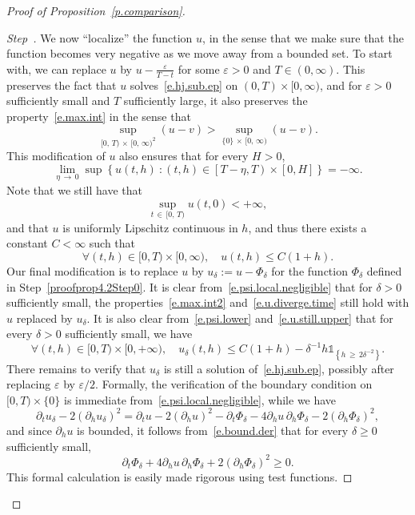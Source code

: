 \documentclass[10pt]{amsart}
\theoremstyle{definition}\newtheorem{defi}[theo]{Definition}\newtheorem{rema}[theo]{Remark}\newtheorem{exam}[theo]{Example}\newtheorem{exem}[theo]{Example}\newtheorem{nota}[theo]{Notation}
\newcommand{\1}{\mathds{1}}
\newcommand{\ep}{\varepsilon}
\renewcommand{\le}{\leqslant}
\renewcommand{\ge}{\geqslant}
\newcommand{\de}{\delta}
\newcounter{stepcount}
\newenvironment{step}{\refstepcounter{stepcount}\begin{proof}[Step~\thestepcount]}{\let\qed\relax\end{proof}}
\let\oldforall\forall
\renewcommand*{\forall}{\mathrel{\oldforall}}
\begin{document}
\begin{proof}[Proof of Proposition~\ref{p.comparison}]
\begin{step}\label{proofprop4.2Step2}
We now ``localize'' the function $u$, in the sense that we make sure that the function becomes very negative as we move away from a bounded set. To start with, we can replace $u$ by $u-\tfrac{\ep}{T-t}$ for some $\ep > 0$ and $T \in (0,\infty)$. This preserves the fact that $u$ solves~\eqref{e.hj.sub.ep} on $(0,T)\times [0,\infty)$, and for $\ep > 0$ sufficiently small and $T$ sufficiently large, it also preserves the property~\eqref{e.max.int} in the sense that
\begin{equation}\label{e.max.int2}
\sup_{[0,\,T)\,\times\,[0,\,\infty)^2} (u-v) > \sup_{\{0\}\,\times \,[0,\,\infty)} (u-v).
\end{equation}
This modification of $u$ also ensures that for every $H > 0$,
\begin{equation}\label{e.u.diverge.time}
\lim_{\eta\,\to\,0} \sup \left\{u(t,h) \ : (t,h) \in \left[T - \eta,T\right) \times [0, H]\right\} = -\infty.
\end{equation}
Note that we still have that
\[
\sup_{t\,\in\,[0,\,T)} u(t,0) < + \infty,
\]
and that $u$ is uniformly Lipschitz continuous in $h$, and thus there exists a constant $C < \infty$ such that
\begin{equation}\label{e.u.still.upper}
\forall (t,h) \in [0,T)\times [0,\infty), \quad u(t,h) \le C(1+h).
\end{equation}
Our final modification is to replace $u$ by $u_\de := u-\Phi_\de$ for the function $\Phi_\de$ defined in Step~\ref{proofprop4.2Step0}. It is clear from~\eqref{e.psi.local.negligible} that for $\delta > 0$ sufficiently small, the properties~\eqref{e.max.int2} and~\eqref{e.u.diverge.time} still hold with $u$ replaced by $u_\de$. It is also clear from~\eqref{e.psi.lower} and~\eqref{e.u.still.upper} that for every $\de > 0$ sufficiently small, we have
\begin{equation}\label{e.u.goes.down}
\forall (t,h) \in [0,T)\times [0,+\infty), \quad u_\de(t,h) \le C(1+h)- \de^{-1} h \1_{\left\{h\,\ge\,2\de^{-2}\right\}}.
\end{equation}
There remains to verify that $u_\delta$ is still a solution of~\eqref{e.hj.sub.ep}, possibly after replacing $\ep$ by $\ep/2$. Formally, the verification of the boundary condition on $[0,T)\times \{0\}$ is immediate from~\eqref{e.psi.local.negligible}, while we have
\[
\partial_t u_\delta - 2 \left(\partial_h u_\delta\right)^2 = \partial_t u - 2 \left(\partial_h u\right)^2 - \partial_t \Phi_\delta - 4 \partial_h u \, \partial_h \Phi_\delta - 2 \left(\partial_h \Phi_\delta\right)^2,
\]
and since $\partial_h u$ is bounded, it follows from~\eqref{e.bound.der} that for every $\delta \ge 0$ sufficiently small,
\[
\partial_t \Phi_\delta + 4 \partial_h u \, \partial_h \Phi_\delta + 2 \left(\partial_h \Phi_\delta\right)^2 \ge 0.
\]
This formal calculation is easily made rigorous using test functions.


\end{step}
\end{proof}
\end{document}
